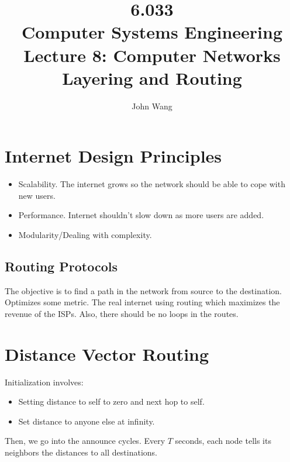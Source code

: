 \documentclass[psamsfonts]{amsart}
\title{6.033 \\
Computer Systems Engineering \\
Lecture 8: Computer Networks Layering and Routing}
\author{John Wang}
\begin{document}
\maketitle

\section{Internet Design Principles}

\begin{itemize}
  \item Scalability. The internet grows so the network should be able to cope with new users.
  \item Performance. Internet shouldn't slow down as more users are added.
  \item Modularity/Dealing with complexity.
\end{itemize}

\subsection{Routing Protocols}

The objective is to find a path in the network from source to the destination. Optimizes some metric. The real internet using routing which maximizes the revenue of the ISPs. Also, there should be no loops in the routes.

\section{Distance Vector Routing}

Initialization involves:
\begin{itemize}
  \item Setting distance to self to zero and next hop to self.
  \item Set distance to anyone else at infinity.
\end{itemize}

Then, we go into the announce cycles. Every $T$ seconds, each node tells its neighbors the distances to all destinations.
\end{document}
